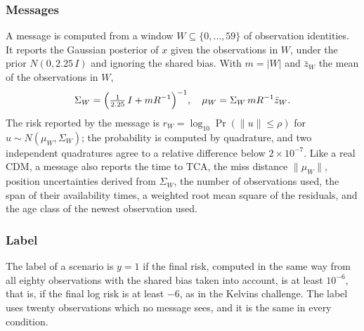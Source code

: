 \documentclass[conference]{IEEEtran}
\begin{document}
\subsubsection*{Messages}
A message is computed from a window $W\subseteq\{0,\dots,59\}$ of observation identities. It reports the Gaussian posterior of $x$ given the observations in $W$, under the prior $N(0,2.25\,I)$ and ignoring the shared bias. With $m=|W|$ and $\bar z_W$ the mean of the observations in $W$,
\begin{equation}\label{eq:posterior}
  \Sigma_W=\Bigl(\tfrac{1}{2.25}\,I+m R^{-1}\Bigr)^{-1},\quad
  \mu_W=\Sigma_W\, m R^{-1}\bar z_W .
\end{equation}
The risk reported by the message is $r_W=\log_{10}\Pr(\|u\|\le\rho)$ for $u\sim N(\mu_W,\Sigma_W)$; the probability is computed by quadrature, and two independent quadratures agree to a relative difference below $2\times10^{-7}$. Like a real CDM, a message also reports the time to TCA, the miss distance $\|\mu_W\|$, position uncertainties derived from $\Sigma_W$, the number of observations used, the span of their availability times, a weighted root mean square of the residuals, and the age class of the newest observation used.

\subsubsection*{Label}
The label of a scenario is $y=1$ if the final risk, computed in the same way from all eighty observations with the shared bias taken into account, is at least $10^{-6}$, that is, if the final log risk is at least $-6$, as in the Kelvins challenge. The label uses twenty observations which no message sees, and it is the same in every condition.
\end{document}
